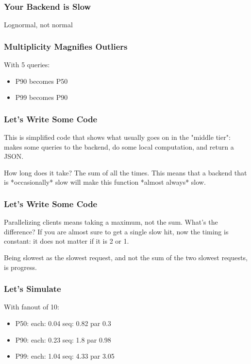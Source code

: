 \begin{frame}
\frametitle{Your Backend is Slow}

Lognormal, not normal

\end{frame}

\begin{frame}
\frametitle{Multiplicity Magnifies Outliers}

With 5 queries:

\begin{itemize}
\item P90 becomes P50
\item P99 becomes P90
\end{itemize}

\end{frame}

\begin{frame}
\frametitle{Let's Write Some Code}



\end{frame}

This is simplified code that shows what usually goes on
in the "middle tier":
makes some queries to the backend,
do some local computation,
and return a JSON.

How long does it take?
The sum of all the times.
This means that a backend that is *occasionally* slow
will make this function *almost always* slow.

\begin{frame}
\frametitle{Let's Write Some Code}



\end{frame}

Parallelizing clients means taking a maximum,
not the sum.
What's the difference?
If you are almost sure to get a single slow hit,
now the timing is constant:
it does not matter if it is 2 or 1.

Being slowest as the slowest request,
and not the sum of the two slowest requests,
is progress.

\begin{frame}
\frametitle{Let's Simulate}

With fanout of 10:

\begin{itemize}
\item P50: each: 0.04 seq: 0.82 par 0.3
\item P90: each: 0.23 seq: 1.8 par 0.98
\item P99: each: 1.04 seq: 4.33 par 3.05
\end{itemize}

\end{frame}


